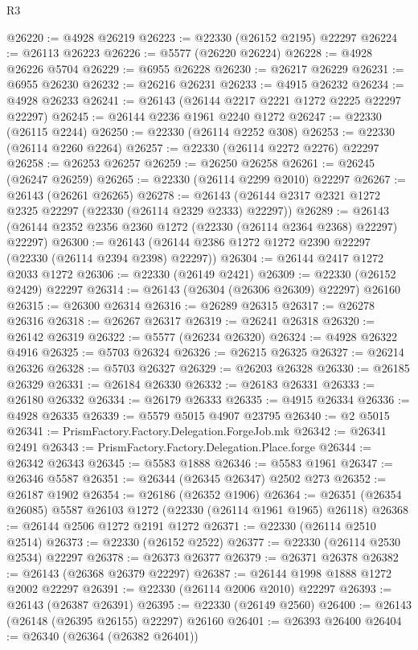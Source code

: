\begin{lexlean}{R3}
\begin{coremodule}
@26220 := @4928 @26219
@26223 := @22330 (@26152 @2195) @22297
@26224 := @26113 @26223
@26226 := @5577 (@26220 @26224)
@26228 := @4928 @26226 @5704
@26229 := @6955 @26228
@26230 := @26217 @26229
@26231 := @6955 @26230
@26232 := @26216 @26231
@26233 := @4915 @26232
@26234 := @4928 @26233
@26241 := @26143 (@26144 @2217 @2221 @1272 @2225 @22297 @22297)
@26245 := @26144 @2236 @1961 @2240 @1272
@26247 := @22330 (@26115 @2244)
@26250 := @22330 (@26114 @2252 @308)
@26253 := @22330 (@26114 @2260 @2264)
@26257 := @22330 (@26114 @2272 @2276) @22297
@26258 := @26253 @26257
@26259 := @26250 @26258
@26261 := @26245 (@26247 @26259)
@26265 := @22330 (@26114 @2299 @2010) @22297
@26267 := @26143 (@26261 @26265)
@26278 := @26143 (@26144 @2317 @2321 @1272 @2325 @22297 (@22330 (@26114 @2329 @2333) @22297))
@26289 := @26143 (@26144 @2352 @2356 @2360 @1272 (@22330 (@26114 @2364 @2368) @22297) @22297)
@26300 := @26143 (@26144 @2386 @1272 @1272 @2390 @22297 (@22330 (@26114 @2394 @2398) @22297))
@26304 := @26144 @2417 @1272 @2033 @1272
@26306 := @22330 (@26149 @2421)
@26309 := @22330 (@26152 @2429) @22297
@26314 := @26143 (@26304 (@26306 @26309) @22297) @26160
@26315 := @26300 @26314
@26316 := @26289 @26315
@26317 := @26278 @26316
@26318 := @26267 @26317
@26319 := @26241 @26318
@26320 := @26142 @26319
@26322 := @5577 (@26234 @26320)
@26324 := @4928 @26322 @4916
@26325 := @5703 @26324
@26326 := @26215 @26325
@26327 := @26214 @26326
@26328 := @5703 @26327
@26329 := @26203 @26328
@26330 := @26185 @26329
@26331 := @26184 @26330
@26332 := @26183 @26331
@26333 := @26180 @26332
@26334 := @26179 @26333
@26335 := @4915 @26334
@26336 := @4928 @26335
@26339 := @5579 @5015 @4907 @23795
@26340 := @2 @5015
@26341 := PrismFactory.Factory.Delegation.ForgeJob.mk
@26342 := @26341 @2491
@26343 := PrismFactory.Factory.Delegation.Place.forge
@26344 := @26342 @26343
@26345 := @5583 @1888
@26346 := @5583 @1961
@26347 := @26346 @5587
@26351 := @26344 (@26345 @26347) @2502 @273
@26352 := @26187 @1902
@26354 := @26186 (@26352 @1906)
@26364 := @26351 (@26354 @26085) @5587 @26103 @1272 (@22330 (@26114 @1961 @1965) @26118)
@26368 := @26144 @2506 @1272 @2191 @1272
@26371 := @22330 (@26114 @2510 @2514)
@26373 := @22330 (@26152 @2522)
@26377 := @22330 (@26114 @2530 @2534) @22297
@26378 := @26373 @26377
@26379 := @26371 @26378
@26382 := @26143 (@26368 @26379 @22297)
@26387 := @26144 @1998 @1888 @1272 @2002 @22297
@26391 := @22330 (@26114 @2006 @2010) @22297
@26393 := @26143 (@26387 @26391)
@26395 := @22330 (@26149 @2560)
@26400 := @26143 (@26148 (@26395 @26155) @22297) @26160
@26401 := @26393 @26400
@26404 := @26340 (@26364 (@26382 @26401))

\end{coremodule}
\end{lexlean}
